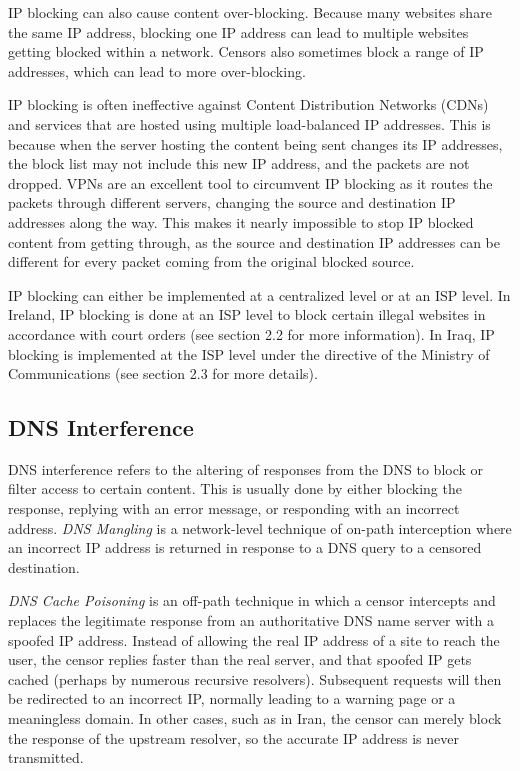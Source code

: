 IP blocking can also cause content over-blocking. Because many websites share the same IP address, blocking one IP address can lead to multiple websites getting blocked within a network. Censors also sometimes block a range of IP addresses, which can lead to more over-blocking.

IP blocking is often ineffective against Content Distribution Networks (CDNs) and services that are hosted using multiple load-balanced IP addresses. This is because when the server hosting the content being sent changes its IP addresses, the block list may not include this new IP address, and the packets are not dropped. VPNs are an excellent tool to circumvent IP blocking as it routes the packets through different servers, changing the source and destination IP addresses along the way. This makes it nearly impossible to stop IP blocked content from getting through, as the source and destination IP addresses can be different for every packet coming from the original blocked source.

IP blocking can either be implemented at a centralized level or at an ISP level. In Ireland, IP blocking is done at an ISP level to block certain illegal websites in accordance with court orders (see section 2.2 for more information). In Iraq, IP blocking is implemented at the ISP level under the directive of the Ministry of Communications \cite{freedomhouseIraqFreedom} (see section 2.3 for more details).

\subsection{DNS Interference}

DNS interference refers to the altering of responses from the DNS to block or filter access to certain content. This is usually done by either blocking the response, replying with an error message, or responding with an incorrect address. \textit{DNS Mangling} is a network-level technique of on-path interception where an incorrect IP address is returned in response to a DNS query to a censored destination. 

\textit{DNS Cache Poisoning} is an off-path technique in which a censor intercepts and replaces the legitimate response from an authoritative DNS name server with a spoofed IP address. Instead of allowing the real IP address of a site to reach the user, the censor replies faster than the real server, and that spoofed IP gets cached (perhaps by numerous recursive resolvers). Subsequent requests will then be redirected to an incorrect IP, normally leading to a warning page or a meaningless domain. In other cases, such as in Iran, the censor can merely block the response of the upstream resolver, so the accurate IP address is never transmitted.

